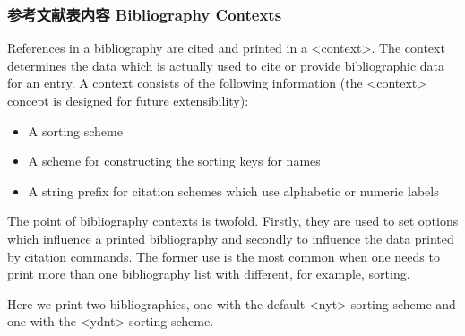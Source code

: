 \subsubsection{参考文献表内容 Bibliography Contexts}
\label{use:bib:context}

References in a bibliography are cited and printed in a <context>. The context determines the data which is actually used to cite or provide bibliographic data for an entry. A context consists of the following information (the <context> concept is designed for future extensibility):

\begin{itemize}
 \item A sorting scheme
 \item A scheme for constructing the sorting keys for names
 \item A string prefix for citation schemes which use alphabetic or numeric
 labels
\end{itemize}
%

%
The point of bibliography contexts is twofold. Firstly, they are used to set options which influence a printed bibliography and secondly to influence the data printed by citation commands.
The former use is the most common when one needs to print more than one bibliography list with different, for example, sorting.

\begin{ltxexample}
\usepackage[sorting=nyt]{biblatex}

\cite{one}
\cite{two}
\printbibliography
\newrefcontext[sorting=ydnt]
\printbibliography
\end{ltxexample}
%
Here we print two bibliographies, one with the default <nyt> sorting scheme and one with the <ydnt> sorting scheme.

